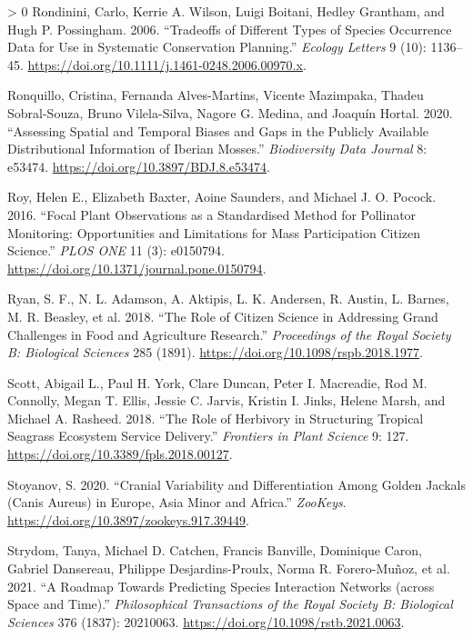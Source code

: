 \documentclass[10pt,oneside]{article}
\newlength{\cslhangindent}
\newenvironment{CSLReferences}[3] %
 {%
  \setlength{\parindent}{0pt}
  \ifodd #1 \everypar{\setlength{\hangindent}{\cslhangindent}}\ignorespaces\fi
  \ifnum #2 > 0
  \setlength{\parskip}{#2\baselineskip}
  \fi
 }%
 {}
\begin{document}
\begin{CSLReferences}{1}{0}
\leavevmode\hypertarget{ref-Rondinini2006TraDif}{}%
Rondinini, Carlo, Kerrie A. Wilson, Luigi Boitani, Hedley Grantham, and
Hugh P. Possingham. 2006. {``Tradeoffs of Different Types of Species
Occurrence Data for Use in Systematic Conservation Planning.''}
\emph{Ecology Letters} 9 (10): 1136--45.
\url{https://doi.org/10.1111/j.1461-0248.2006.00970.x}.

\leavevmode\hypertarget{ref-Ronquillo2020AssSpa}{}%
Ronquillo, Cristina, Fernanda Alves-Martins, Vicente Mazimpaka, Thadeu
Sobral-Souza, Bruno Vilela-Silva, Nagore G. Medina, and Joaquín Hortal.
2020. {``Assessing Spatial and Temporal Biases and Gaps in the Publicly
Available Distributional Information of Iberian Mosses.''}
\emph{Biodiversity Data Journal} 8: e53474.
\url{https://doi.org/10.3897/BDJ.8.e53474}.

\leavevmode\hypertarget{ref-Roy2016FocPla}{}%
Roy, Helen E., Elizabeth Baxter, Aoine Saunders, and Michael J. O.
Pocock. 2016. {``Focal Plant Observations as a Standardised Method for
Pollinator Monitoring: Opportunities and Limitations for Mass
Participation Citizen Science.''} \emph{PLOS ONE} 11 (3): e0150794.
\url{https://doi.org/10.1371/journal.pone.0150794}.

\leavevmode\hypertarget{ref-Ryan2018RolCit}{}%
Ryan, S. F., N. L. Adamson, A. Aktipis, L. K. Andersen, R. Austin, L.
Barnes, M. R. Beasley, et al. 2018. {``The Role of Citizen Science in
Addressing Grand Challenges in Food and Agriculture Research.''}
\emph{Proceedings of the Royal Society B: Biological Sciences} 285
(1891). \url{https://doi.org/10.1098/rspb.2018.1977}.

\leavevmode\hypertarget{ref-Scott2018RolHer}{}%
Scott, Abigail L., Paul H. York, Clare Duncan, Peter I. Macreadie, Rod
M. Connolly, Megan T. Ellis, Jessie C. Jarvis, Kristin I. Jinks, Helene
Marsh, and Michael A. Rasheed. 2018. {``The Role of Herbivory in
Structuring Tropical Seagrass Ecosystem Service Delivery.''}
\emph{Frontiers in Plant Science} 9: 127.
\url{https://doi.org/10.3389/fpls.2018.00127}.

\leavevmode\hypertarget{ref-Stoyanov2020CraVar}{}%
Stoyanov, S. 2020. {``Cranial Variability and Differentiation Among
Golden Jackals (Canis Aureus) in Europe, Asia Minor and Africa.''}
\emph{ZooKeys}. \url{https://doi.org/10.3897/zookeys.917.39449}.

\leavevmode\hypertarget{ref-Strydom2021RoaPre}{}%
Strydom, Tanya, Michael D. Catchen, Francis Banville, Dominique Caron,
Gabriel Dansereau, Philippe Desjardins-Proulx, Norma R. Forero-Muñoz, et
al. 2021. {``A Roadmap Towards Predicting Species Interaction Networks
(across Space and Time).''} \emph{Philosophical Transactions of the
Royal Society B: Biological Sciences} 376 (1837): 20210063.
\url{https://doi.org/10.1098/rstb.2021.0063}.


\end{CSLReferences}
\end{document}
